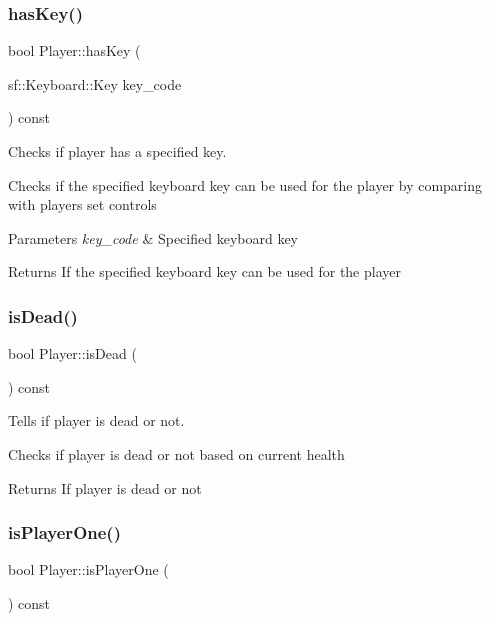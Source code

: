 \subsubsection{\texorpdfstring{has\+Key()}{hasKey()}}
{\footnotesize\ttfamily bool Player\+::has\+Key (\begin{DoxyParamCaption}\item[{sf\+::\+Keyboard\+::\+Key}]{key\+\_\+code }\end{DoxyParamCaption}) const}



Checks if player has a specified key. 

Checks if the specified keyboard key can be used for the player by comparing with player\textquotesingle{}s set controls 
\begin{DoxyParams}{Parameters}
{\em key\+\_\+code} & Specified keyboard key \\
\hline
\end{DoxyParams}
\begin{DoxyReturn}{Returns}
If the specified keyboard key can be used for the player 
\end{DoxyReturn}
\mbox{\label{classPlayer_a20665e4647baa8f898a62021e6204450}} 
\subsubsection{\texorpdfstring{is\+Dead()}{isDead()}}
{\footnotesize\ttfamily bool Player\+::is\+Dead (\begin{DoxyParamCaption}{ }\end{DoxyParamCaption}) const}



Tells if player is dead or not. 

Checks if player is dead or not based on current health \begin{DoxyReturn}{Returns}
If player is dead or not 
\end{DoxyReturn}
\mbox{\label{classPlayer_ae70f285a61f1bb20d824f44cb28efa4b}} 
\subsubsection{\texorpdfstring{is\+Player\+One()}{isPlayerOne()}}
{\footnotesize\ttfamily bool Player\+::is\+Player\+One (\begin{DoxyParamCaption}{ }\end{DoxyParamCaption}) const}



